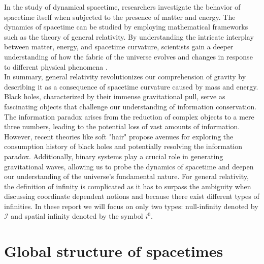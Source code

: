In the study of dynamical spacetime, researchers investigate the behavior of spacetime itself when subjected to the presence of matter and energy. The dynamics of spacetime can be studied by employing mathematical frameworks such as the theory of general relativity. By understanding the intricate interplay between matter, energy, and spacetime curvature, scientists gain a deeper understanding of how the fabric of the universe evolves and changes in response to different physical phenomena \cite{DaiVal02}.
\\
In summary, general relativity revolutionizes our comprehension of gravity by describing it as a consequence of spacetime curvature caused by mass and energy. Black holes, characterized by their immense gravitational pull, serve as fascinating objects that challenge our understanding of information conservation. The information paradox arises from the reduction of complex objects to a mere three numbers, leading to the potential loss of vast amounts of information. However, recent theories like soft "hair" propose avenues for exploring the consumption history of black holes and potentially resolving the information paradox. Additionally, binary systems play a crucial role in generating gravitational waves, allowing us to probe the dynamics of spacetime and deepen our understanding of the universe's fundamental nature. For general relativity, the definition of infinity is complicated as it has to surpass the ambiguity when discussing coordinate dependent notions and because there exist different types of infinities. In these report we will focus on only two types: null-infinity denoted by $\mathscr{I}$ and spatial infinity denoted by the symbol $i^0$.


\section{Global structure of spacetimes}
\label{section:Global structure of spacetimes}

